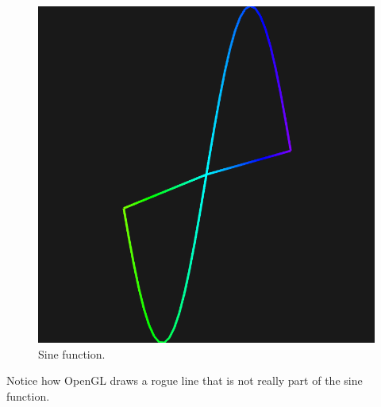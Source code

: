 \documentclass[]{article}
\begin{document}
\begin{multicols}{2}
\begin{figure}[H]
\includegraphics[width=\columnwidth]{sine.png}
\caption{Sine function.}
\label{fig:sine}
\end{figure}
Notice how OpenGL draws a rogue line that is not really part of the sine function.


\end{multicols}
\end{document}
